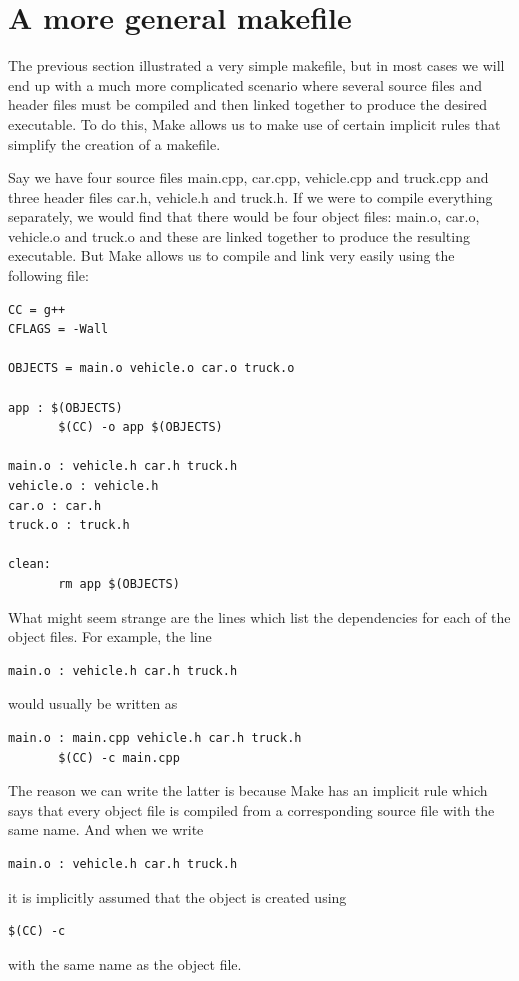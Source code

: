 
\section{A more general makefile}

The previous section illustrated a very simple makefile, but in most cases we will end up with a much more complicated scenario where several source files and header files must be compiled and then linked together to produce the desired executable. To do this, Make allows us to make use of certain implicit rules that simplify the creation of a makefile. 

Say we have four source files main.cpp, car.cpp, vehicle.cpp and truck.cpp and three header files car.h, vehicle.h and truck.h.  If we were to compile everything separately, we would find that there would be four object files: main.o, car.o, vehicle.o and truck.o and these are linked together to produce the resulting executable. But Make allows us to compile and link very easily using the following file:
\begin{verbatim}
CC = g++
CFLAGS = -Wall

OBJECTS = main.o vehicle.o car.o truck.o

app : $(OBJECTS)
       $(CC) -o app $(OBJECTS)

main.o : vehicle.h car.h truck.h
vehicle.o : vehicle.h
car.o : car.h
truck.o : truck.h

clean:
       rm app $(OBJECTS)
\end{verbatim}

What might seem strange are the lines which list the dependencies for each of the object files. For example, the line 
\begin{verbatim}
main.o : vehicle.h car.h truck.h
\end{verbatim}
would usually be written as
\begin{verbatim}
main.o : main.cpp vehicle.h car.h truck.h
       $(CC) -c main.cpp 
\end{verbatim}
The reason we can write the latter is because Make has an implicit rule which says that every object file is compiled from a corresponding source file with the same name. And when we write
\begin{verbatim}
main.o : vehicle.h car.h truck.h
\end{verbatim}
it is implicitly assumed that the object is created using
\begin{verbatim}
$(CC) -c 
\end{verbatim}
with the same name as the object file.

